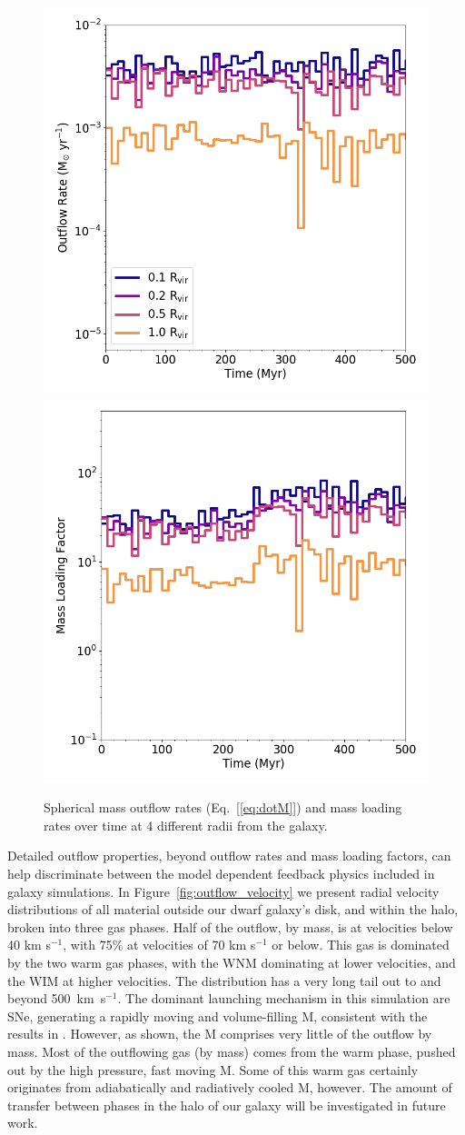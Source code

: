 \documentclass[twocolumn]{aastex61}
\begin{document}
\begin{figure}
\centering
\includegraphics[width=0.45\linewidth]{total_mass_outflow}
\includegraphics[width=0.45\linewidth]{total_mass_loading}
\caption{Spherical mass outflow rates (Eq.~[\ref{eq:dotM}]) and mass loading rates over time at 4 different radii from the galaxy.}
\label{fig:mass_outflow}
\end{figure}

Detailed outflow properties, beyond outflow rates and mass loading factors, can help discriminate between the model dependent feedback physics included in galaxy simulations. In Figure~\ref{fig:outflow_velocity} we present radial velocity distributions of all material outside our dwarf galaxy's disk, and within the halo, broken into three gas phases. Half of the outflow, by mass, is at velocities below 40 km s$^{-1}$, with 75\% at velocities of 70 km s$^{-1}$ or below. This gas is dominated by the two warm gas phases, with the WNM dominating at lower velocities, and the WIM at higher velocities. The distribution has a very long tail out to and beyond 500~km~s$^{-1}$. The dominant launching mechanism in this simulation are SNe, generating a rapidly moving and volume-filling M, consistent with the results in \citet{Hu2016,Hu2017}. However, as shown, the M comprises very little of the outflow by mass. Most of the outflowing gas (by mass) comes from the warm phase, pushed out by the high pressure, fast moving M. Some of this warm gas certainly originates from adiabatically and radiatively cooled M, however. The amount of transfer between phases in the halo of our galaxy will be investigated in future work.
\end{document}
